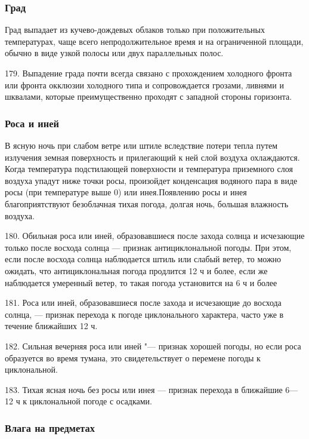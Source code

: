 \subsubsection{Град}

Град выпадает из кучево-дождевых облаков только при положительных температурах, чаще всего непродолжительное время и на ограниченной площади, обычно в виде узкой полосы или двух параллельных полос.

179. Выпадение града почти всегда связано с прохождением холодного фронта или фронта окклюзии холодного типа и сопровождается грозами, ливнями и шквалами, которые преимущественно проходят с западной стороны горизонта.

\subsubsection{Роса и иней}

В ясную ночь при слабом ветре или штиле вследствие потери тепла путем излучения земная поверхность и прилегающий к ней слой воздуха охлаждаются. Когда температура подстилающей поверхности и температура приземного слоя воздуха упадут ниже точки росы, произойдет конденсация водяного пара в виде росы (при температуре выше 0) или инея.Появлению росы и инея благоприятствуют безоблачная тихая погода, долгая ночь, большая влажность воздуха.

180. Обильная роса или иней, образовавшиеся после захода солнца и исчезающие только после восхода солнца — признак антициклональной погоды. При этом, если после восхода солнца наблюдается штиль или слабый ветер, то можно ожидать, что антициклональная погода продлится 12 ч и более, если же наблюдается умеренный ветер, то такая погода установится на 6 ч и более

181. Роса или иней, образовавшиеся после захода и исчезающие до восхода солнца, — признак перехода к погоде циклонального характера, часто уже в течение ближайших 12 ч.

182. Сильная вечерняя роса или иней "--- признак хорошей погоды, но если роса образуется во время тумана, это свидетельствует о перемене погоды к циклональной.

183. Тихая ясная ночь без росы или инея — признак перехода в ближайшие 6—12 ч к циклональной погоде с осадками.

\subsubsection{Влага на предметах}

